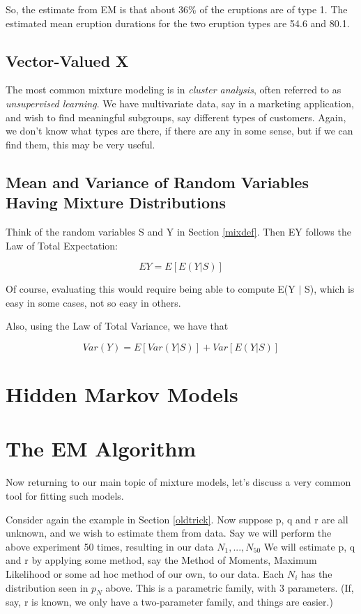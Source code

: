 \documentclass[11pt]{article}
\begin{document}
So, the estimate from EM is that about 36\% of the eruptions are of type
1.  The estimated mean eruption durations for the two eruption types
are 54.6 and 80.1.

\subsection{Vector-Valued X}

The most common mixture modeling is in \textit{cluster analysis}, often
referred to as \textit{unsupervised learning}.  We have multivariate
data, say in a marketing application, and wish to find meaningful
subgroups, say different types of customers.  Again, we don't know what
types are there, if there are any in some sense, but if we can find
them, this may be very useful.

\subsection{Mean and Variance of Random Variables Having Mixture
Distributions}
\label{mixmeanvar}

Think of the random variables S and Y in Section \ref{mixdef}.
Then EY follows the Law of Total Expectation:

\begin{equation}
\label{mixmean}
EY = E[E(Y | S)]
\end{equation}

Of course, evaluating this would require being able to compute E(Y $|$
S), which is easy in some cases, not so easy in others.

Also, using the Law of Total Variance, we have that

\begin{equation}
\label{mixvar}
Var(Y) = E[Var(Y|S)] + Var[E(Y|S)]
\end{equation}

\section{Hidden Markov Models}

\section{The EM Algorithm} 
\label{emalg}

Now returning to our main topic of mixture models, let's discuss a very
common tool for fitting such models.

Consider again the example in Section \ref{oldtrick}.  Now suppose p, q
and r are all unknown, and we wish to estimate them from data. Say we
will perform the above experiment 50 times, resulting in our data
$N_1,...,N_{50}$ We will estimate p, q and r by applying some method,
say the Method of Moments, Maximum Likelihood or some ad hoc method of
our own, to our data. Each $N_i$ has the distribution seen in $p_N$
above. This is a parametric family, with 3 parameters. (If, say, r is
known, we only have a two-parameter family, and things are easier.)
\end{document}
